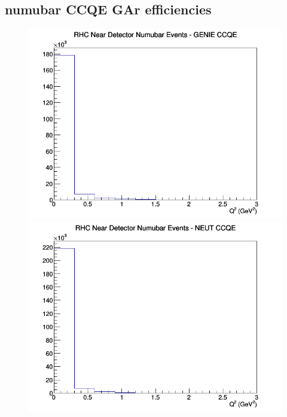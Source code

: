 \subsection{numubar CCQE GAr efficiencies}
\begin{figure}[h]
\includegraphics[width=\linewidth]{eff_Q2/GAr/CCQE_RHC_ND_numubar_Q2_GENIE.png}
\endminipage
{}
\includegraphics[width=\linewidth]{eff_Q2/GAr/CCQE_RHC_ND_numubar_Q2_NEUT.png}
\endminipage
{}

\end{figure}
